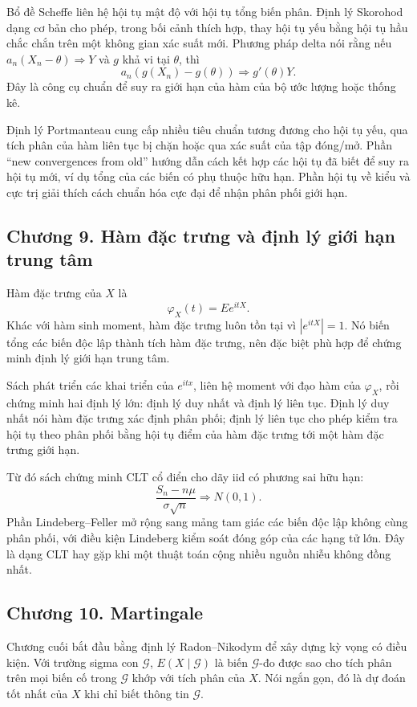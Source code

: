 \documentclass[11pt]{article}
\begin{document}
Bổ đề Scheffe liên hệ hội tụ mật độ với hội tụ tổng biến phân. Định lý Skorohod
dạng cơ bản cho phép, trong bối cảnh thích hợp, thay hội tụ yếu bằng hội tụ hầu
chắc chắn trên một không gian xác suất mới. Phương pháp delta nói rằng nếu
\(a_n(X_n-\theta)\Rightarrow Y\) và \(g\) khả vi tại \(\theta\), thì
\[
  a_n(g(X_n)-g(\theta))\Rightarrow g'(\theta)Y.
\]
Đây là công cụ chuẩn để suy ra giới hạn của hàm của bộ ước lượng hoặc thống
kê.

Định lý Portmanteau cung cấp nhiều tiêu chuẩn tương đương cho hội tụ yếu,
qua tích phân của hàm liên tục bị chặn hoặc qua xác suất của tập đóng/mở. Phần
``new convergences from old'' hướng dẫn cách kết hợp các hội tụ đã biết để suy
ra hội tụ mới, ví dụ tổng của các biến có phụ thuộc hữu hạn. Phần hội tụ về
kiểu và cực trị giải thích cách chuẩn hóa cực đại để nhận phân phối giới hạn.

\subsection*{Chương 9. Hàm đặc trưng và định lý giới hạn trung tâm}

Hàm đặc trưng của \(X\) là
\[
  \varphi_X(t)=E e^{itX}.
\]
Khác với hàm sinh moment, hàm đặc trưng luôn tồn tại vì \(|e^{itX}|=1\). Nó
biến tổng các biến độc lập thành tích hàm đặc trưng, nên đặc biệt phù hợp để
chứng minh định lý giới hạn trung tâm.

Sách phát triển các khai triển của \(e^{itx}\), liên hệ moment với đạo hàm của
\(\varphi_X\), rồi chứng minh hai định lý lớn: định lý duy nhất và định lý liên
tục. Định lý duy nhất nói hàm đặc trưng xác định phân phối; định lý liên tục
cho phép kiểm tra hội tụ theo phân phối bằng hội tụ điểm của hàm đặc trưng
tới một hàm đặc trưng giới hạn.

Từ đó sách chứng minh CLT cổ điển cho dãy iid có phương sai hữu hạn:
\[
  \frac{S_n-n\mu}{\sigma\sqrt{n}}\Rightarrow N(0,1).
\]
Phần Lindeberg--Feller mở rộng sang mảng tam giác các biến độc lập không cùng
phân phối, với điều kiện Lindeberg kiểm soát đóng góp của các hạng tử lớn. Đây
là dạng CLT hay gặp khi một thuật toán cộng nhiều nguồn nhiễu không đồng nhất.

\subsection*{Chương 10. Martingale}

Chương cuối bắt đầu bằng định lý Radon--Nikodym để xây dựng kỳ vọng có điều
kiện. Với trường sigma con \(\mathcal{G}\), \(E(X\mid\mathcal{G})\) là biến
\(\mathcal{G}\)-đo được sao cho tích phân trên mọi biến cố trong
\(\mathcal{G}\) khớp với tích phân của \(X\). Nói ngắn gọn, đó là dự đoán tốt
nhất của \(X\) khi chỉ biết thông tin \(\mathcal{G}\).
\end{document}
